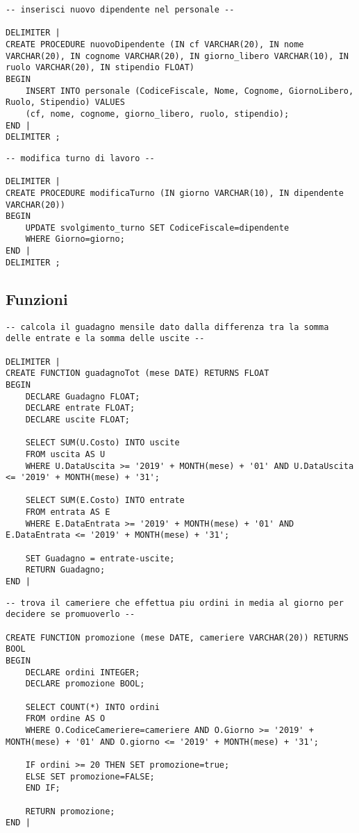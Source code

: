 \begin{lstlisting}[title=Operazione 5, style=mysqlStyle]
-- inserisci nuovo dipendente nel personale --

DELIMITER |
CREATE PROCEDURE nuovoDipendente (IN cf VARCHAR(20), IN nome VARCHAR(20), IN cognome VARCHAR(20), IN giorno_libero VARCHAR(10), IN ruolo VARCHAR(20), IN stipendio FLOAT)
BEGIN
    INSERT INTO personale (CodiceFiscale, Nome, Cognome, GiornoLibero, Ruolo, Stipendio) VALUES
    (cf, nome, cognome, giorno_libero, ruolo, stipendio);
END |
DELIMITER ;
\end{lstlisting}

\begin{lstlisting}[title=Operazione 6, style=mysqlStyle]
-- modifica turno di lavoro --

DELIMITER |
CREATE PROCEDURE modificaTurno (IN giorno VARCHAR(10), IN dipendente VARCHAR(20))
BEGIN
    UPDATE svolgimento_turno SET CodiceFiscale=dipendente
    WHERE Giorno=giorno;
END |
DELIMITER ;
\end{lstlisting}

\newpage
\subsection{Funzioni} %
\begin{lstlisting}[title=Operazione 11, style=mysqlStyle]
-- calcola il guadagno mensile dato dalla differenza tra la somma delle entrate e la somma delle uscite --

DELIMITER |
CREATE FUNCTION guadagnoTot (mese DATE) RETURNS FLOAT
BEGIN 
    DECLARE Guadagno FLOAT;
    DECLARE entrate FLOAT;
    DECLARE uscite FLOAT;
    
    SELECT SUM(U.Costo) INTO uscite
    FROM uscita AS U
    WHERE U.DataUscita >= '2019' + MONTH(mese) + '01' AND U.DataUscita <= '2019' + MONTH(mese) + '31';
    
    SELECT SUM(E.Costo) INTO entrate 
    FROM entrata AS E
    WHERE E.DataEntrata >= '2019' + MONTH(mese) + '01' AND E.DataEntrata <= '2019' + MONTH(mese) + '31';
    
    SET Guadagno = entrate-uscite;
    RETURN Guadagno;
END |
\end{lstlisting}

\begin{lstlisting}[title=Operazione 12, style=mysqlStyle]
-- trova il cameriere che effettua piu ordini in media al giorno per decidere se promuoverlo --

CREATE FUNCTION promozione (mese DATE, cameriere VARCHAR(20)) RETURNS BOOL
BEGIN
    DECLARE ordini INTEGER;
    DECLARE promozione BOOL;
    
    SELECT COUNT(*) INTO ordini
    FROM ordine AS O
    WHERE O.CodiceCameriere=cameriere AND O.Giorno >= '2019' + MONTH(mese) + '01' AND O.giorno <= '2019' + MONTH(mese) + '31';
    
    IF ordini >= 20 THEN SET promozione=true;
    ELSE SET promozione=FALSE;
    END IF;
    
    RETURN promozione;
END |
\end{lstlisting}

